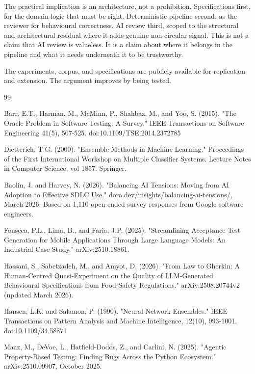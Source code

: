 \documentclass{article}
\begin{document}
The practical implication is an architecture, not a prohibition.
Specifications first, for the domain logic that must be right.
Deterministic pipeline second, as the reviewer for behavioural
correctness. AI review third, scoped to the structural and architectural
residual where it adds genuine non-circular signal. This is not a claim
that AI review is valueless. It is a claim about where it belongs in the
pipeline and what it needs underneath it to be trustworthy.

The experiments, corpus, and specifications are publicly available for
replication and extension. The argument improves by being tested.


\begin{thebibliography}{99}

Barr, E.T., Harman, M., McMinn, P., Shahbaz, M., and Yoo, S. (2015).
"The Oracle Problem in Software Testing: A Survey." IEEE Transactions on
Software Engineering 41(5), 507-525. doi:10.1109/TSE.2014.2372785

Dietterich, T.G. (2000). "Ensemble Methods in Machine Learning."
Proceedings of the First International Workshop on Multiple Classifier
Systems. Lecture Notes in Computer Science, vol 1857. Springer.

Baolin, J. and Harvey, N. (2026). "Balancing AI Tensions: Moving from
AI Adoption to Effective SDLC Use." dora.dev/insights/balancing-ai-tensions/,
March 2026. Based on 1,110 open-ended survey responses from Google
software engineers.

Fonseca, P.L., Lima, B., and Faria, J.P. (2025). "Streamlining Acceptance
Test Generation for Mobile Applications Through Large Language Models:
An Industrial Case Study." arXiv:2510.18861.

Hassani, S., Sabetzadeh, M., and Amyot, D. (2026). "From Law to Gherkin:
A Human-Centred Quasi-Experiment on the Quality of LLM-Generated
Behavioural Specifications from Food-Safety Regulations."
arXiv:2508.20744v2 (updated March 2026).

Hansen, L.K. and Salamon, P. (1990). "Neural Network Ensembles." IEEE
Transactions on Pattern Analysis and Machine Intelligence, 12(10),
993-1001. doi:10.1109/34.58871

Maaz, M., DeVoe, L., Hatfield-Dodds, Z., and Carlini, N. (2025).
"Agentic Property-Based Testing: Finding Bugs Across the Python
Ecosystem." arXiv:2510.09907, October 2025.


\end{thebibliography}
\end{document}
